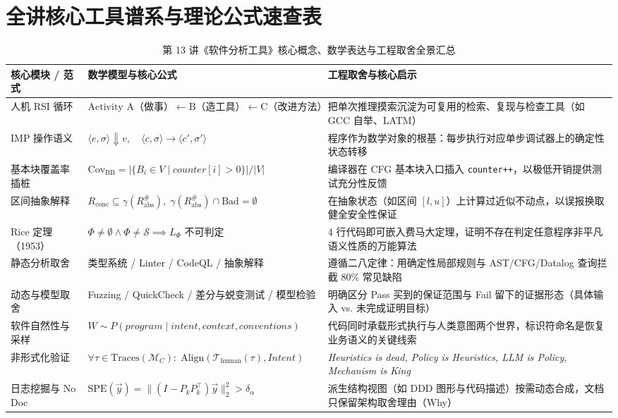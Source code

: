 \documentclass[a4paper]{article}
\begin{document}
\newpage
\section*{全讲核心工具谱系与理论公式速查表}

\begin{table}[H]
\centering
\caption{第 13 讲《软件分析工具》核心概念、数学表达与工程取舍全景汇总}
\label{tab:lecture13_summary}
\begin{tabular}{p{3.2cm}p{5.5cm}p{5.6cm}}
\toprule
\textbf{核心模块 / 范式} & \textbf{数学模型与核心公式} & \textbf{工程取舍与核心启示} \\
\midrule
人机 RSI 循环 & $\text{Activity A（做事）} \leftarrow \text{B（造工具）} \leftarrow \text{C（改进方法）}$ & 把单次推理摸索沉淀为可复用的检索、复现与检查工具（如 GCC 自举、LATM） \\
IMP 操作语义 & $\langle e, \sigma \rangle \Downarrow v,\quad \langle c, \sigma \rangle \to \langle c', \sigma' \rangle$ & 程序作为数学对象的根基：每步执行对应单步调试器上的确定性状态转移 \\
基本块覆盖率插桩 & $\mathrm{Cov}_{\text{BB}} = |\{B_i \in V \mid \mathit{counter}[i] > 0\}| / |V|$ & 编译器在 CFG 基本块入口插入 \texttt{counter++}，以极低开销提供测试充分性反馈 \\
区间抽象解释 & $R_{\text{conc}} \subseteq \gamma(R^\#_{\text{abs}}),\; \gamma(R^\#_{\text{abs}}) \cap \text{Bad} = \emptyset$ & 在抽象状态（如区间 $[l,u]$）上计算过近似不动点，以误报换取健全安全性保证 \\
Rice 定理（1953） & $\Phi \neq \emptyset \land \Phi \neq \mathcal{S} \implies L_{\Phi} \text{ 不可判定}$ & 4 行代码即可嵌入费马大定理，证明不存在判定任意程序非平凡语义性质的万能算法 \\
静态分析取舍 & 类型系统 / Linter / CodeQL / 抽象解释 & 遵循二八定律：用确定性局部规则与 AST/CFG/Datalog 查询拦截 80\% 常见缺陷 \\
动态与模型取舍 & Fuzzing / QuickCheck / 差分与蜕变测试 / 模型检验 & 明确区分 Pass 买到的保证范围与 Fail 留下的证据形态（具体输入 vs. 未完成证明目标） \\
软件自然性与采样 & $W \sim P(\mathit{program} \mid \mathit{intent}, \mathit{context}, \mathit{conventions})$ & 代码同时承载形式执行与人类意图两个世界，标识符命名是恢复业务语义的关键线索 \\
非形式化验证 & $\forall \tau \in \mathrm{Traces}(\mathcal{M}_C):\; \mathrm{Align}(\mathcal{T}_{\text{human}}(\tau), \mathit{Intent})$ & \textit{Heuristics is dead, Policy is Heuristics, LLM is Policy, Mechanism is King} \\
日志挖掘与 No Doc & $\mathrm{SPE}(\vec{y}) = \|(I - P_k P_k^\top)\vec{y}\|_2^2 > \delta_\alpha$ & 派生结构视图（如 DDD 图形与代码描述）按需动态合成，文档只保留架构取舍理由（Why） \\
\bottomrule
\end{tabular}
\end{table}
\end{document}

